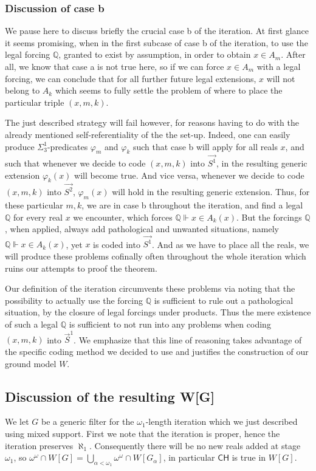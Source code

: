 \documentclass[a4paper,11pt]{article}
\newcommand{\forceQ}{\mathbb{Q}}
\newcommand{\CH}{\mathsf{CH}}
\begin{document}
\subsubsection{Discussion of case b}
We pause here to discuss briefly the crucial case b of the iteration. At first glance it seems promising, when in the first subcase of case b of the iteration, to use the legal forcing $\forceQ$, granted to exist by assumption, in order to obtain $x \in A_m$. After all, we know that case a is not true here, so if we can force $x \in A_m$ with a legal forcing, we can conclude that for all further future legal extensions, $x$ will not belong to $A_k$ which seems to fully settle the problem of where to place the particular triple $(x,m,k)$.

The just described strategy will fail however, for reasons having to do with the already mentioned self-referentiality of the the set-up. Indeed, one can easily produce $\Sigma^1_3$-predicates $\varphi_m$ and $\varphi_k$ such that case b will apply for all reals $x$, and such that whenever we decide to code $(x,m,k)$ into $\vec{S^1}$, in the resulting generic extension $\varphi_k(x)$ will become true. And vice versa, whenever we decide to code $(x,m,k)$ into $\vec{S^2}$, $\varphi_m(x)$ will hold in the resulting generic extension.
Thus, for these particular $m,k$, we are in case b throughout the iteration, and find a legal $\forceQ$ for every real $x$ we encounter, which forces $\forceQ \Vdash x \in A_k(x)$. But the forcings $\forceQ$, when applied, always add  pathological and unwanted situations, namely  $\forceQ \Vdash x \in A_k(x)$, yet $x$ is coded into $\vec{S^1}$. And as we have to place all the reals, we will produce these problems cofinally often throughout the whole iteration which ruins our attempts to proof the theorem.

Our definition of the iteration circumvents these problems via noting that the possibility to actually use the forcing $\forceQ$ is sufficient to rule out a pathological situation, by the closure of legal forcings under products. Thus the mere existence of such a legal $\forceQ$ is sufficient to not run into any problems when coding $(x,m,k)$ into $\vec{S}^1$.
We emphasize that this line of reasoning takes advantage of the specific coding method we decided to use and justifies the  construction of our ground model $W$.





\subsection{Discussion of the resulting W[G]}
We let $G$ be a generic filter for the $\omega_1$-length iteration which we just described using mixed support.
First we note that the iteration is proper, hence the iteration preserves $\aleph_1$. Consequently there will be no new reals added at stage $\omega_1$, so $\omega^{\omega} \cap W[G] = \bigcup_{\alpha< \omega_1} \omega^{\omega} \cap W[G_{\alpha}]$,  in particular $\CH$ is true in $W[G]$.
\end{document}
